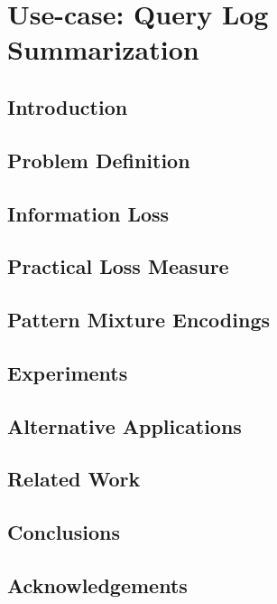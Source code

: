 \chapter{Use-case: Query Log Summarization}
\section{Introduction}


\section{Problem Definition}
\label{sec:problemdefinition}


\section{Information Loss}
\label{sec:analyzingsummaries}


\section{Practical Loss Measure}
\label{sec:practicalrepresentativeness}


\section{Pattern Mixture Encodings}


\section{Experiments}
\label{sec:experiments}


\section{Alternative Applications}
\label{sec:evaluatingalternativeapplications}


\section{Related Work}
\label{sec:backgroundandrelatedwork}


\section{Conclusions}
\label{sec:conclusion}


\balance

\section{Acknowledgements}
